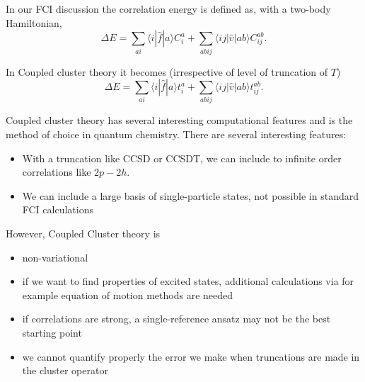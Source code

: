 \documentclass[%
twoside,                 %
final,                   %
10pt]{article}
\begin{document}
\noindent


In our FCI discussion the correlation energy is defined as, with a two-body Hamiltonian,  
\[
\Delta E=\sum_{ai}\langle i| \hat{f}|a \rangle C_{i}^{a}+
\sum_{abij}\langle ij | \hat{v}| ab \rangle C_{ij}^{ab}.
\]

In Coupled cluster theory it becomes (irrespective of level of truncation of $T$)
\[
\Delta E=\sum_{ai}\langle i| \hat{f}|a \rangle t_{i}^{a}+
\sum_{abij}\langle ij | \hat{v}| ab \rangle t_{ij}^{ab}.
\]

Coupled cluster theory has several interesting computational features and is the method of choice in quantum chemistry. There are several interesting features:
\begin{itemize}
\item With a truncation like CCSD or CCSDT, we can include to infinite order correlations like $2p-2h$.

\item We can include a large basis of single-particle states, not possible in standard FCI calculations
\end{itemize}

\noindent
However, Coupled Cluster theory is
\begin{itemize}
\item non-variational

\item if we want to find properties of excited states, additional calculations via for example equation of motion methods are needed

\item if correlations are strong, a single-reference ansatz may not be the best starting point

\item we cannot quantify properly the error we make when truncations are made in the cluster operator
\end{itemize}

\noindent



\printindex
\end{document}
